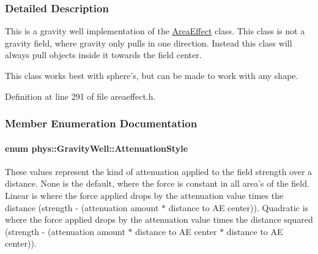 \subsubsection{Detailed Description}
This is a gravity well implementation of the \hyperlink{classphys_1_1AreaEffect}{AreaEffect} class. This class is not a gravity field, where gravity only pulls in one direction. Instead this class will always pull objects inside it towards the field center. \par
 This class works best with sphere's, but can be made to work with any shape. 

Definition at line 291 of file areaeffect.h.



\subsubsection{Member Enumeration Documentation}
\hypertarget{classphys_1_1GravityWell_a72d0da5f140b91bc364f2c46e7536e1f}{
\paragraph[{AttenuationStyle}]{\setlength{\rightskip}{0pt plus 5cm}enum {\bf phys::GravityWell::AttenuationStyle}}\hfill}
\label{d6/d21/classphys_1_1GravityWell_a72d0da5f140b91bc364f2c46e7536e1f}


These values represent the kind of attenuation applied to the field strength over a distance. None is the default, where the force is constant in all area's of the field. Linear is where the force applied drops by the attenuation value times the distance (strength -\/ (attenuation amount $\ast$ distance to AE center)). Quadratic is where the force applied drops by the attenuation value times the distance squared (strength -\/ (attenuation amount $\ast$ distance to AE center $\ast$ distance to AE center)). 

